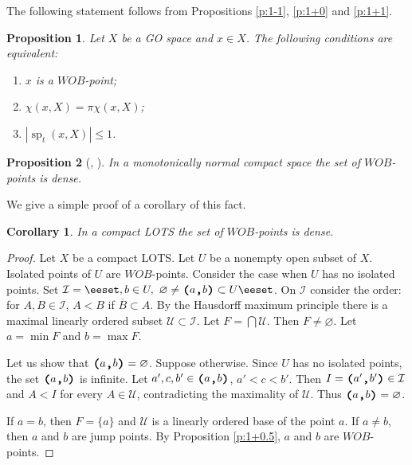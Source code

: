 \documentclass[preprint]{elsarticle}
\def\cl#1{\overline{#1}}
\def\sp{\operatorname{sp}}
\def\es{\varnothing}
\def\sset#1{\{#1\}}
\def\set#1{\bbset#1\eeset}
\def\bbset#1:#2\eeset{\{#1\,:\,#2\}}
\def\cU{{\mathcal U}}
\def\cI{{\mathcal I}}
\newtheorem{proposition}{Proposition}[section]
\newtheorem{cor}{Corollary}[section]
\theoremstyle{definition}
\theoremstyle{remark}
\def\wob/{$WOB$}
\def\ilcomma/{\boldsymbol{,}}
\def\ilsymlp{\boldsymbol{(}}
\def\ilsymrp{\boldsymbol{)}}
\def\ilfont#1{\boldsymbol{#1}}
\def\ilfontX#1{\mathrm{\text{\texttt{\textbf{\large #1}}}}}
\def\ilfontX#1{{\text{\texttt{\textbf{\large \upshape #1}}}}}
\def\ilfont#1{\raisebox{-1.2pt}{\ilfontX{#1}}}
\def\ilfontC#1{\raisebox{-0.7pt}{\ilfontX{#1}}}
\def\ilcomma/{\ilfontC{,}}
\def\ilsymlp{\ilfont{(}}
\def\ilsymrp{\ilfont{)}}
\def\ilpp(#1,#2){\ilsymlp#1\ilcomma/ #2\ilsymrp}
\begin{document}
The following statement follows from Propositions \ref{p:1-1}, \ref{p:1+0} and \ref{p:1+1}.

\begin{proposition}\label{p:1+2}
Let $X$ be a GO space and $x\in X$.
The following conditions are equivalent:
\begin{enumerate}
\item
$x$ is a \wob/-point;
\item
$\chi(x,X)= \pi\chi(x,X)$;
\item
$|\sp_t(x,X)|\leq 1$.
\end{enumerate}
\end{proposition}

\begin{proposition}[{\cite[Theorem 2.5]{WilliamsZhou1998}, \cite[Theorem 3.12 (iii)]{Juhasz1992}}]\label{p:1+3}
In a monotonically normal compact space the set of \wob/-points is dense.
\end{proposition}

We give a simple proof of a corollary of this fact.

\begin{cor}\label{c:cfgos:1}
In a compact LOTS the set of \wob/-points is dense.
\end{cor}
\begin{proof}
Let $X$ be a compact LOTS. Let $U$ be a nonempty open subset of $X$.
Isolated points of $U$ are \wob/-points. Consider the case when $U$ has no isolated points.
Set $\cI=\set{\ilpp(a,b): a,b\in U,\ \es\neq\ilpp(a,b)\subset U}$. On $\cI$ consider the order: for $A,B\in \cI$, $A<B$ if $\cl B\subset A$.
By the Hausdorff maximum principle there is a maximal linearly ordered subset $\cU\subset \cI$. Let $F=\bigcap\cU$. Then $F\neq\es$. Let $a=\min F$ and $b=\max F$.

Let us show that $\ilpp(a,b)=\es$. Suppose otherwise. Since $U$ has no isolated points, the set $\ilpp(a,b)$ is infinite. Let $a',c,b'\in \ilpp(a,b)$, $a'<c<b'$. Then $I=\ilpp(a',b')\in \cI$ and $A<I$ for every $A\in \cU$, contradicting the maximality of $\cU$. Thus $\ilpp(a,b)=\es$.

If $a=b$, then $F=\sset{a}$ and $\cU$ is a linearly ordered base of the point $a$. If $a\neq b$, then $a$ and $b$ are jump points. By Proposition \ref{p:1+0.5}, $a$ and $b$ are \wob/-points.
\end{proof}

\end{document}
